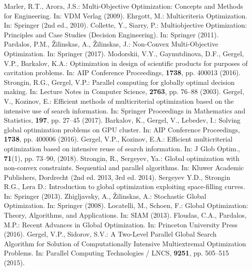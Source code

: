 \documentclass[runningheads]{llncs}
\begin{document}
%
%
%
% 
% 
%
\begin{thebibliography}{8}


 	Marler, R.T., Arora, J.S.: Multi-Objective Optimization: Concepts and Methods for Engineering. In: VDM Verlag (2009).
 	Ehrgott, M.: Multicriteria Optimization. In: Springer (2nd ed., 2010). 
 	Collette, Y., Siarry, P.: Multiobjective Optimization: Principles and Case Studies (Decision Engineering). In: Springer (2011).
 	Pardalos, P.M., {\v Z}ilinskas, A., {\v Z}ilinskas, J.: Non-Convex Multi-Objective Optimization. In: Springer (2017). 
 	Modorskii, V.Y., Gaynutdinova, D.F., Gergel, V.P., Barkalov, K.A.: Optimization in design of scientific products for purposes of cavitation problems. In: AIP Conference Proceedings, \textbf{1738}, pp. 400013 (2016). 
 	Strongin, R.G., Gergel, V.P.: Parallel computing for globally optimal decision making. In: Lecture Notes in Computer Science, \textbf{2763}, pp. 76--88 (2003).
 	Gergel, V., Kozinov, E.: Efficient methods of multicriterial optimization based on the intensive use of search information. In: Springer Proceedings in Mathematics and Statistics, \textbf{197}, pp. 27--45 (2017). 
 	Barkalov, K., Gergel, V., Lebedev, I.: Solving global optimization problems on GPU cluster. In: AIP Conference Proceedings, \textbf{1738}, pp. 400006 (2016).
 	Gergel, V.P., Kozinov, E.A.: Efficient multicriterial optimization based on intensive reuse of search information. In: J Glob Optim., \textbf{71}(1), pp. 73--90, (2018).
	Strongin, R., Sergeyev, Ya.: Global optimization with non-convex constraints. Sequential and parallel algorithms. In: Kluwer Academic Publishers, Dordrecht (2nd ed. 2013, 3rd ed. 2014).
	Sergeyev Y.D., Strongin R.G., Lera D.: Introduction to global optimization exploiting space-filling curves. In: Springer (2013).
	Zhigljavsky, A., {\v Z}ilinskas, A.: Stochastic Global Optimization. In: Springer (2008).
	Locatelli, M., Schoen, F.: Global Optimization: Theory, Algorithms, and Applications. In: SIAM (2013).
	Floudas, C.A., Pardalos, M.P.: Recent Advances in Global Optimization. In: Princeton University Press (2016).
	Gergel, V.P., Sidorov, S.V.: A Two-Level Parallel Global Search Algorithm for Solution of Computationally Intensive Multiextremal Optimization Problems. In: Parallel Computing Technologies / LNCS, \textbf{9251}, pp. 505--515 (2015).

\end{thebibliography}
\end{document}
